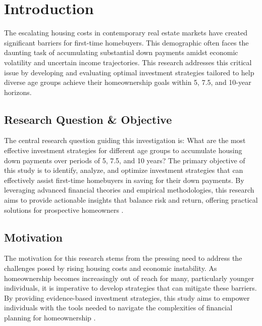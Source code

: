 \section{Introduction}
The escalating housing costs in contemporary real estate markets have created significant barriers for first-time homebuyers. This demographic often faces the daunting task of accumulating substantial down payments amidst economic volatility and uncertain income trajectories. This research addresses this critical issue by developing and evaluating optimal investment strategies tailored to help diverse age groups achieve their homeownership goals within 5, 7.5, and 10-year horizons.

\subsection{Research Question \& Objective}
The central research question guiding this investigation is: What are the most effective investment strategies for different age groups to accumulate housing down payments over periods of 5, 7.5, and 10 years? The primary objective of this study is to identify, analyze, and optimize investment strategies that can effectively assist first-time homebuyers in saving for their down payments. By leveraging advanced financial theories and empirical methodologies, this research aims to provide actionable insights that balance risk and return, offering practical solutions for prospective homeowners \citep{markowitz1952portfolio, sharpe1966mutual, boyle1977options}.

\subsection{Motivation}
The motivation for this research stems from the pressing need to address the challenges posed by rising housing costs and economic instability. As homeownership becomes increasingly out of reach for many, particularly younger individuals, it is imperative to develop strategies that can mitigate these barriers. By providing evidence-based investment strategies, this study aims to empower individuals with the tools needed to navigate the complexities of financial planning for homeownership \citep{nar, fed2023, bls2023}.

\newpage
